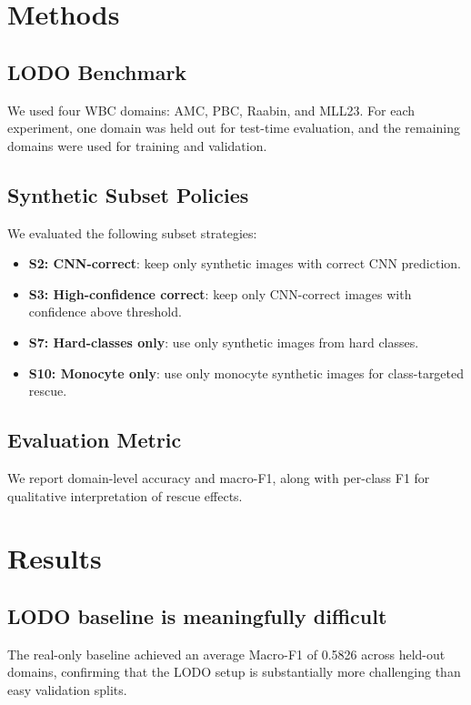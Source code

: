 \documentclass[11pt]{article}
\begin{document}
\section{Methods}

\subsection{LODO Benchmark}

We used four WBC domains: AMC, PBC, Raabin, and MLL23. For each experiment, one domain was held out for test-time evaluation, and the remaining domains were used for training and validation.

\subsection{Synthetic Subset Policies}

We evaluated the following subset strategies:
\begin{itemize}
  \item \textbf{S2: CNN-correct}: keep only synthetic images with correct CNN prediction.
  \item \textbf{S3: High-confidence correct}: keep only CNN-correct images with confidence above threshold.
  \item \textbf{S7: Hard-classes only}: use only synthetic images from hard classes.
  \item \textbf{S10: Monocyte only}: use only monocyte synthetic images for class-targeted rescue.
\end{itemize}

\subsection{Evaluation Metric}

We report domain-level accuracy and macro-F1, along with per-class F1 for qualitative interpretation of rescue effects.

\section{Results}

\subsection{LODO baseline is meaningfully difficult}

The real-only baseline achieved an average Macro-F1 of 0.5826 across held-out domains, confirming that the LODO setup is substantially more challenging than easy validation splits.
\end{document}
